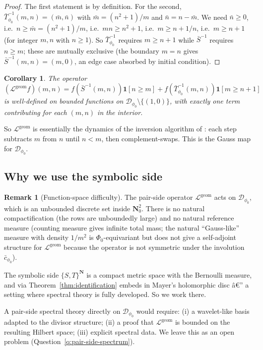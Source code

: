 ﻿\documentclass[11pt]{article}
\newtheorem{corollary}[theorem]{Corollary}
\theoremstyle{definition}
\newtheorem{remark}[theorem]{Remark}
\newcommand{\N}{\mathbf{N}}
\newcommand{\Nz}{\mathbf{N}_0}
\newcommand{\Dphi}{\mathcal{D}_{\phi_0}}
\newcommand{\Sb}{\bar{S}}
\newcommand{\Tb}{\bar{T}_{\phi_0}}
\newcommand{\cb}{\bar{c}_{\phi_0}}
\newcommand{\Phio}{\Phi_0}
\newcommand{\Lop}{\mathcal{L}}
\begin{document}
\begin{proof}
The first statement is by definition. For the second, $\Tb^{-1}(m,n)=(\bar m,\bar n)$ with $\bar m = (n^2+1)/m$ and $\bar n = n-\bar m$. We need $\bar n\ge 0$, i.e.\ $n\ge\bar m=(n^2+1)/m$, i.e.\ $mn\ge n^2+1$, i.e.\ $m\ge n+1/n$, i.e.\ $m\ge n+1$ (for integer $m,n$ with $n\ge 1$). So $\Tb^{-1}$ requires $m\ge n+1$ while $\Sb^{-1}$ requires $n\ge m$; these are mutually exclusive (the boundary $m=n$ gives $\Sb^{-1}(m,n)=(m,0)$, an edge case absorbed by initial condition).
\end{proof}

\begin{corollary}\label{cor:Lop-geom-well-defined}
The operator $(\Lop^{\mathrm{geom}}f)(m,n) = f(\Sb^{-1}(m,n))\mathbf{1}[n\ge m] + f(\Tb^{-1}(m,n))\mathbf{1}[m\ge n+1]$ is well-defined on bounded functions on $\Dphi\setminus\{(1,0)\}$, with exactly one term contributing for each $(m,n)$ in the interior.
\end{corollary}

So $\Lop^{\mathrm{geom}}$ is essentially the dynamics of the inversion algorithm of \cite[Algorithm~3.1]{shakov2024}: each step subtracts $m$ from $n$ until $n<m$, then complement-swaps. This is the Gauss map for $\Dphi$.

\subsection{Why we use the symbolic side}

\begin{remark}[Function-space difficulty]
The pair-side operator $\Lop^{\mathrm{geom}}$ acts on $\Dphi$, which is an unbounded discrete set inside $\Nz^2$. There is no natural compactification (the rows are unboundedly large) and no natural reference measure (counting measure gives infinite total mass; the natural ``Gauss-like'' measure with density $1/m^2$ is $\Phio$-equivariant but does not give a self-adjoint structure for $\Lop^{\mathrm{geom}}$ because the operator is not symmetric under the involution $\cb$).

The symbolic side $\{S,T\}^\N$ is a compact metric space with the Bernoulli measure, and via Theorem~\ref{thm:identification} embeds in Mayer's holomorphic disc â€” a setting where spectral theory is fully developed. So we work there.

A pair-side spectral theory directly on $\Dphi$ would require: (i) a wavelet-like basis adapted to the divisor structure; (ii) a proof that $\Lop^{\mathrm{geom}}$ is bounded on the resulting Hilbert space; (iii) explicit spectral data. We leave this as an open problem (Question~\ref{q:pair-side-spectrum}).
\end{remark}
\end{document}
